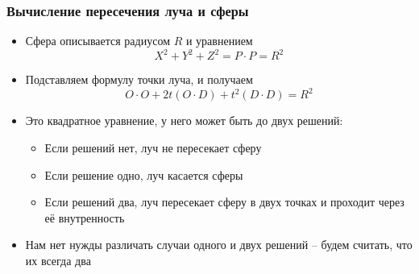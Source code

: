 \documentclass[10pt,handout]{beamer}
\begin{document}
\begin{frame}
\frametitle{Вычисление пересечения луча и сферы}
\begin{itemize}
\item Сфера описывается радиусом \begin{math}R\end{math} и уравнением
\begin{equation}
X^2+Y^2+Z^2=P\cdot P = R^2
\end{equation}
\pause
\item Подставляем формулу точки луча, и получаем
\begin{equation}
O\cdot O + 2t (O\cdot D) + t^2 (D\cdot D) = R^2
\end{equation}
\pause
\item Это квадратное уравнение, у него может быть до двух решений:
\pause
\begin{itemize}
\item Если решений нет, луч не пересекает сферу
\item Если решение одно, луч касается сферы
\item Если решений два, луч пересекает сферу в двух точках и проходит через её внутренность
\end{itemize}
\pause
\item Нам нет нужды различать случаи одного и двух решений -- будем считать, что их всегда два
\end{itemize}
\end{frame}
\end{document}
